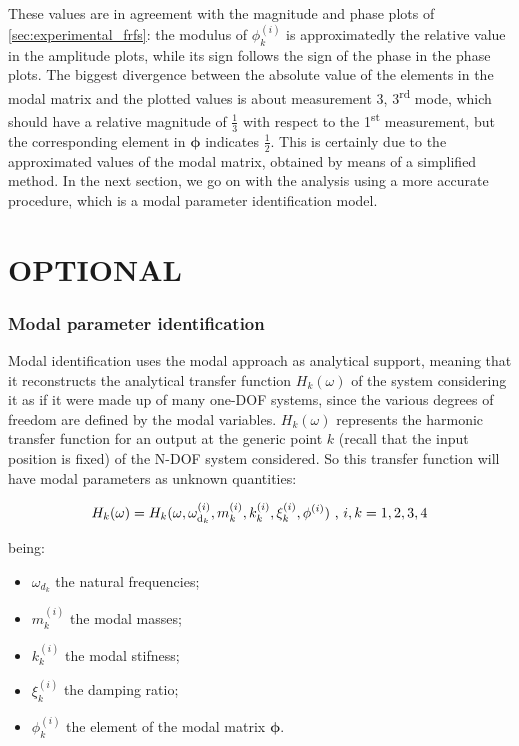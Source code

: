 \documentclass[a4paper,12pt,oneside]{article}
\renewcommand{\thesection}{\arabic{section})}
\renewcommand{\thesubsection}{\arabic{section}\alph{subsection})}
\begin{document}
These values are in agreement with the magnitude and phase plots of \ref{sec:experimental_frfs}: the modulus of $ \phi^{(i)}_k $ is approximatedly the relative value in the amplitude plots, while its sign follows the sign of the phase in the phase plots. The biggest divergence between the absolute value of the elements in the modal matrix and the plotted values is about measurement 3, 3\textsuperscript{rd} mode, which should have a relative magnitude of $ \frac{1}{3} $ with respect to the 1\textsuperscript{st} measurement, but the corresponding element in $ \bm{\phi} $ indicates $ \frac{1}{2} $. This is certainly due to the approximated values of the modal matrix, obtained by means of a simplified method. In the next section, we go on with the analysis using a more accurate procedure, which is a modal parameter identification model.

\clearpage


\part*{OPTIONAL}

\setcounter{section}{0}
\renewcommand{\thesection}{\roman{section})}
\renewcommand{\thesubsection}{\roman{section}\alph{subsection})}

\section{Modal parameter identification}

Modal identification uses the modal approach as analytical support, meaning that
it reconstructs the analytical transfer function $ H_k( \omega) $ of the system considering it as if it were made up of many one-DOF systems, since the various degrees of freedom are defined by the modal variables. $ H_k ( \omega) $ represents the harmonic transfer function for an output at the generic point $ k $ (recall that the input position is fixed) of the N-DOF system considered. So this transfer function will have modal parameters as unknown quantities:

\[
	H_k(\omega) = H_k(\omega, \omega_{\textup{d}_k}^{(i)},
		m_k ^{(i)}, k_k ^{(i)}, \xi_k ^{(i)}, \mathbf{\phi}^{(i)})
		~ \text{,} ~ i,k = 1,2,3,4
\]

being:

\begin{itemize}
	\item $ \omega_{d_k} $ the natural frequencies;
	\item $ m_k ^{(i)} $ the modal masses;
	\item $ k_k ^{(i)} $ the modal stifness;
	\item $ \xi_k ^{(i)} $ the damping ratio;
	\item $ \phi_k^{(i)} $ the element of the modal matrix $ \bm{\phi} $.
\end{itemize}
\end{document}
